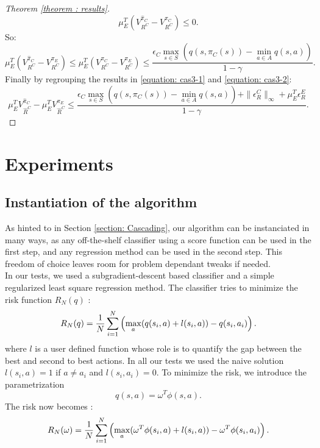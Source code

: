 \documentclass{article} %
\newcommand{\0}{\mathbf{0}}
\newcommand{\1}{\mathbf{1}}
\begin{document}
\begin{proof}[Theorem \ref{theorem : results}]
\begin{equation}
\mu_E^T(V^{\hat{\pi}_C}_{R^C}-V^{\pi_C}_{R^C})\leq 0.
\end{equation}
So:
\begin{equation}
\label{equation: cas3-2}
\mu_E^T(V^{\hat{\pi}_C}_{R^C}-V^{\pi_E}_{R^C})\leq \mu_E^T(V^{\pi_C}_{R^C}-V^{\pi_E}_{R^C})\leq \frac{\epsilon_C\max_{s\in S}(q(s,\pi_C(s))-\min_{a\in A}q(s,a))}{1-\gamma}.
\end{equation}
Finally by regrouping the results in \eqref{equation: cas3-1} and \eqref{equation: cas3-2}:
\begin{equation}
\mu_E^TV^{\hat{\pi}_C}_{\hat{R}^C}-\mu_E^TV^{\pi_E}_{\hat{R}^C}\leq \frac{\epsilon_C\max_{s\in S}(q(s,\pi_C(s))-\min_{a\in A}q(s,a))+\|\epsilon^C_R\|_{\infty}+\mu_E^T\epsilon^E_R}{1-\gamma}.
\end{equation}
\end{proof}

\section{Experiments}
\label{section: experiments}
\subsection{Instantiation of the algorithm}
As hinted to in Section \ref{section: Cascading}, our algorithm can be instanciated in many ways, as any off-the-shelf classifier using a score function can be used in the first step, and any regression method can be used in the second step. This freedom of choice leaves room for problem dependant tweaks if needed.\\

In our tests, we used a subgradient-descent based classifier and a simple regularized least square regression method. The classifier tries to minimize the risk function $R_N(q)$ :
\begin{equation}
  R_N(q) = {1\over N} \sum_{i=1}^N\left(\max_{a}(q(s_i,a) + l(s_i,a)) - q(s_i,a_i) \right).
\end{equation}
where $l$ is a user defined function whose role is to quantify the gap between the best and second to best actions. In all our tests we used the naive solution $l(s_i,a) = 1$ if $a\neq a_i$ and $l(s_i,a_i) = 0$. To minimize the risk, we introduce the parametrization 
\begin{equation}
  q(s,a) = \omega^T\phi(s,a).
\end{equation}
The risk now becomes :
\begin{equation}
  R_N(\omega) = {1\over N} \sum_{i=1}^N\left(\max_{a}(\omega^T\phi(s_i,a) + l(s_i,a)) - \omega^T\phi(s_i,a_i) \right).
\end{equation}
\end{document}
